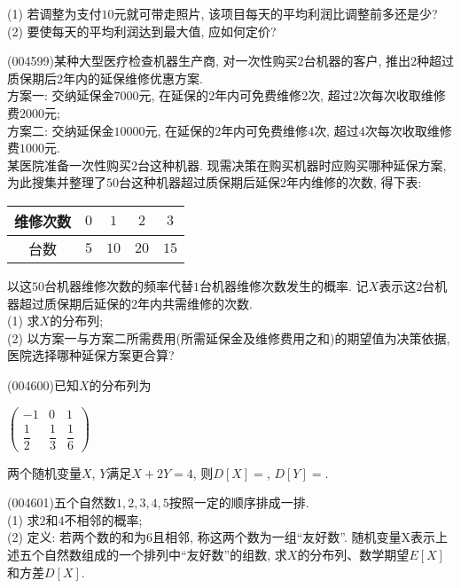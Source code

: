 (1) 若调整为支付$10$元就可带走照片, 该项目每天的平均利润比调整前多还是少?\\
(2) 要使每天的平均利润达到最大值, 应如何定价?
\item (004599)某种大型医疗检查机器生产商, 对一次性购买$2$台机器的客户, 推出$2$种超过质保期后$2$年内的延保维修优惠方案.\\
方案一: 交纳延保金$7000$元, 在延保的$2$年内可免费维修$2$次, 超过$2$次每次收取维修费$2000$元;\\
方案二: 交纳延保金$10000$元, 在延保的$2$年内可免费维修$4$次, 超过$4$次每次收取维修费$1000$元.\\
某医院准备一次性购买$2$台这种机器. 现需决策在购买机器时应购买哪种延保方案, 为此搜集并整理了$50$台这种机器超过质保期后延保$2$年内维修的次数, 得下表:
\begin{center}
    \begin{tabular}{|c|c|c|c|c|}
        \hline
        维修次数 & $0$ & $1$ & $2$ & $3$\\ \hline
        台数 & $5$ & $10$ & $20$ & $15$\\ \hline
    \end{tabular}
\end{center}
以这$50$台机器维修次数的频率代替$1$台机器维修次数发生的概率. 记$X$表示这$2$台机器超过质保期后延保的$2$年内共需维修的次数.\\
(1) 求$X$的分布列;\\
(2) 以方案一与方案二所需费用(所需延保金及维修费用之和)的期望值为决策依据, 医院选择哪种延保方案更合算?
\item (004600)已知$X$的分布列为
\begin{center}
    $\begin{pmatrix}
        -1 & 0 & 1 \\
        \dfrac 12 & \dfrac 13 & \dfrac 16      
    \end{pmatrix}$
\end{center}
两个随机变量$X$, $Y$满足$X+2Y=4$, 则$D[X]=$, $D[Y]=$.
\item (004601)五个自然数$1, 2, 3, 4, 5$按照一定的顺序排成一排.\\
(1) 求$2$和$4$不相邻的概率;\\
(2) 定义: 若两个数的和为$6$且相邻, 称这两个数为一组``友好数''. 随机变量X表示上述五个自然数组成的一个排列中``友好数''的组数, 求$X$的分布列、数学期望$E[X]$和方差$D[X]$.
